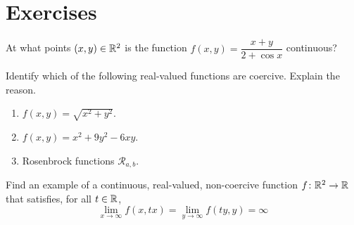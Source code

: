 
\section*{Exercises}
\begin{problem}
At what points $(x,y) \in \mathbb{R}^2$ is the function $f(x,y) = \dfrac{x+y}{2+\cos x}$ continuous?
\end{problem}

\begin{problem}
Identify which of the following real-valued functions are coercive.  Explain the reason.
\begin{enumerate}
	\item $f(x,y) = \sqrt{x^2+y^2}$.
	\item $f(x,y) = x^2 + 9y^2 - 6xy$.
	\item Rosenbrock functions $\mathcal{R}_{a,b}$.
\end{enumerate}
\end{problem}

\begin{problem}
Find an example of a continuous, real-valued, non-coercive function $f\colon \mathbb{R}^2 \to \mathbb{R}$ that satisfies, for all $t \in \mathbb{R}$,
\begin{equation*}
\lim_{x \to \infty} f(x, tx) = \lim_{y \to \infty} f(ty, y) = \infty
\end{equation*}
\end{problem}